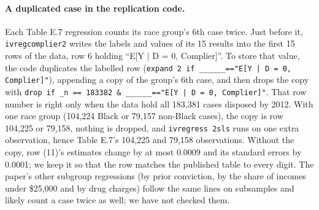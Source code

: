 \documentclass[11pt]{article}
\begin{document}
\paragraph{A duplicated case in the replication code.} Each Table E.7 regression counts its race group's 6th case twice. Just before it, \texttt{ivregcomplier2} writes the labels and values of its 15 results into the first 15 rows of the data, row 6 holding ``E[Y $|$ D = 0, Complier]''. To store that value, the code duplicates the labelled row (\texttt{expand 2 if \_\_\_\_\_\_=="E[Y | D = 0, Complier]"}), appending a copy of the group's 6th case, and then drops the copy with \texttt{drop if \_n == 183382 \& \_\_\_\_\_\_=="E[Y | D = 0, Complier]"}. That row number is right only when the data hold all 183,381 cases disposed by 2012. With one race group (104,224 Black or 79,157 non-Black cases), the copy is row 104,225 or 79,158, nothing is dropped, and \texttt{ivregress 2sls} runs on one extra observation, hence Table E.7's 104,225 and 79,158 observations. Without the copy, row (11)'s estimates change by at most 0.0009 and its standard errors by 0.0001; we keep it so that the row matches the published table to every digit. The paper's other subgroup regressions (by prior conviction, by the share of incomes under \$25,000 and by drug charges) follow the same lines on subsamples and likely count a case twice as well; we have not checked them.
\end{document}
